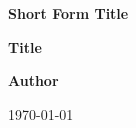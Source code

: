 
\begin{titlepage}
    \begin{center}
        \vspace*{1in}
        \Huge
        \textbf{Short Form Title}


        \vspace{0.5in}
        \LARGE
        \textbf{Title}
            
        \vspace{0.7in}
            
        \vspace{0.7in}
            
        \textbf{Author\\}
            
        \vspace{1.2in}
        \LARGE
        
            
        \vspace{0.3in}
            

        
        \Large
        \today
            
        \vspace{1.1in}

    \end{center}
\end{titlepage}
    